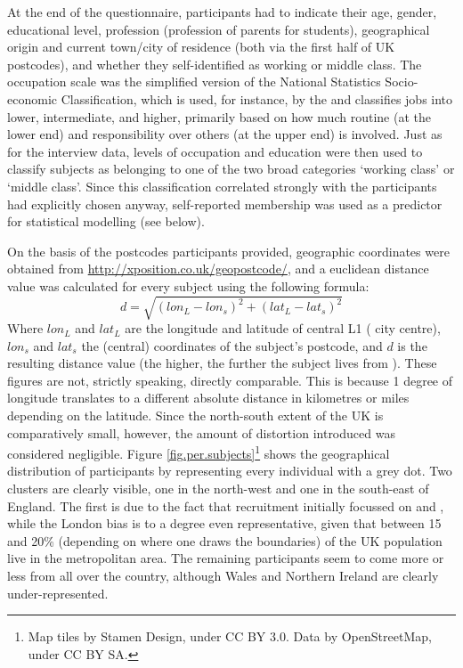 At the end of the questionnaire, participants had to indicate their age, gender, educational level, profession (profession of parents for students), geographical origin and current town/city of residence (both via the first half of UK postcodes), and whether they self-identified as working or middle class.
The occupation scale was the simplified version of the National Statistics Socio-economic Classification, which is used, for instance, by the \citeauthor{nomis} and classifies jobs into lower, intermediate, and higher, primarily based on how much routine (at the lower end) and responsibility over others (at the upper end) is involved.
Just as for the interview data, levels of occupation and education were then used to classify subjects as belonging to one of the two broad categories `working class' or `middle class'.
Since this classification correlated strongly with the  participants had explicitly chosen anyway, self-reported  membership was used as a predictor for statistical modelling (see below).

On the basis of the postcodes participants provided, geographic coordinates were obtained from \url{http://xposition.co.uk/geopostcode/}, and a euclidean distance value was calculated for every subject using the following formula:
\begin{equation}
d = \sqrt{(lon_L - lon_s)^2 + (lat_L - lat_s)^2}
\end{equation}
Where \(lon_L\) and \(lat_L\) are the longitude and latitude of central L1 ( city centre), \(lon_s\) and \(lat_s\) the (central) coordinates of the subject's postcode, and \(d\) is the resulting distance value (the higher, the further the subject lives from ).
These figures are not, strictly speaking, directly comparable.
This is because 1 degree of longitude translates to a different absolute distance in kilometres or miles depending on the latitude.
Since the north-south extent of the UK is comparatively small, however, the amount of distortion introduced was considered negligible.
Figure \ref{fig.per.subjects}\footnote{Map tiles by Stamen Design, under CC BY 3.0. Data by OpenStreetMap, under CC BY SA.} shows the geographical distribution of participants by representing every individual with a grey dot.
Two clusters are clearly visible, one in the north-west and one in the south-east of England.
The first is due to the fact that recruitment initially focussed on  and , while the London bias is to a degree even representative, given that between 15 and 20\% (depending on where one draws the boundaries) of the UK population live in the metropolitan area.
The remaining participants seem to come more or less from all over the country, although Wales and Northern Ireland are clearly under-represented.

